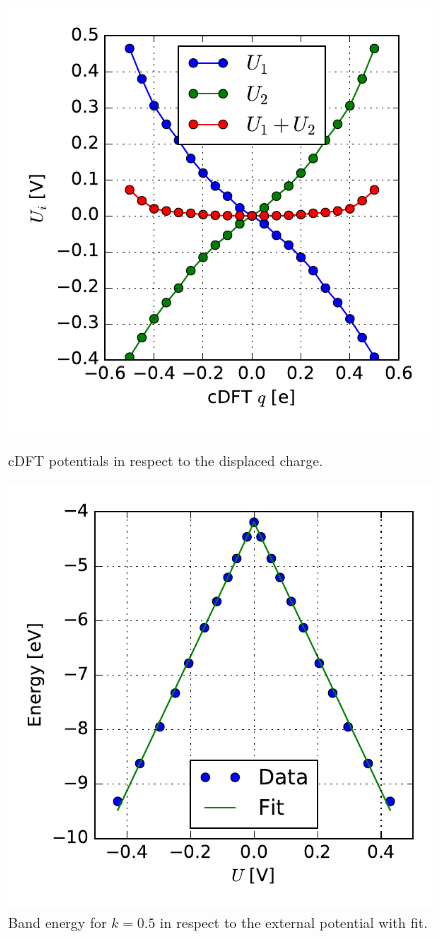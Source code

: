 \begin{figure}
	\centering
	\begin{minipage}{0.49\textwidth}
	\centering
	\includegraphics[width = \textwidth]{Images/Hydrogen/charging/potential_q_1}
	\caption{cDFT potentials in respect to the displaced charge.}
	\label{image_potentials_qs_1}
	\end{minipage}\hspace*{.5cm}
	\begin{minipage}{0.49\textwidth}
	\centering
	\includegraphics[width = \textwidth]{Images/Hydrogen/charging/border_energy_q_1}
	\caption{Band energy for $k = 0.5$ in respect to the external potential with fit.}
	\label{image_edge_energy_qs_1}
	\end{minipage}
\end{figure}
